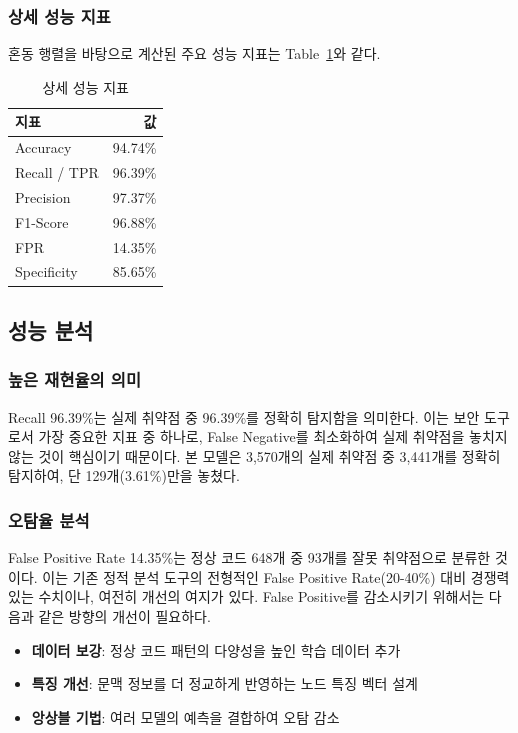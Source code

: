 \subsubsection{상세 성능 지표}
혼동 행렬을 바탕으로 계산된 주요 성능 지표는 Table~\ref{tab:detailed_metrics}와 같다.

\begin{table}[H]
    \centering
    \begin{tabular*}{0.8\textwidth}{@{\extracolsep{\fill}} lr}
        \toprule
        \textbf{지표} & \textbf{값} \\
        \midrule
        Accuracy & 94.74\% \\
        Recall / TPR & 96.39\% \\
        Precision & 97.37\% \\
        F1-Score & 96.88\% \\
        FPR & 14.35\% \\
        Specificity & 85.65\% \\
        \bottomrule
    \end{tabular*}
    \caption{상세 성능 지표}
    \label{tab:detailed_metrics}
\end{table}

\subsection{성능 분석}

\subsubsection{높은 재현율의 의미}
Recall 96.39\%는 실제 취약점 중 96.39\%를 정확히 탐지함을 의미한다. 이는 보안 도구로서 가장 중요한 지표 중 하나로, False Negative를 최소화하여 실제 취약점을 놓치지 않는 것이 핵심이기 때문이다. 본 모델은 3,570개의 실제 취약점 중 3,441개를 정확히 탐지하여, 단 129개(3.61\%)만을 놓쳤다.

\subsubsection{오탐율 분석}
False Positive Rate 14.35\%는 정상 코드 648개 중 93개를 잘못 취약점으로 분류한 것이다. 이는 기존 정적 분석 도구의 전형적인 False Positive Rate(20-40\%) 대비 경쟁력 있는 수치이나, 여전히 개선의 여지가 있다. False Positive를 감소시키기 위해서는 다음과 같은 방향의 개선이 필요하다.

\begin{itemize}
    \item \textbf{데이터 보강}: 정상 코드 패턴의 다양성을 높인 학습 데이터 추가
    \item \textbf{특징 개선}: 문맥 정보를 더 정교하게 반영하는 노드 특징 벡터 설계
    \item \textbf{앙상블 기법}: 여러 모델의 예측을 결합하여 오탐 감소
\end{itemize}

